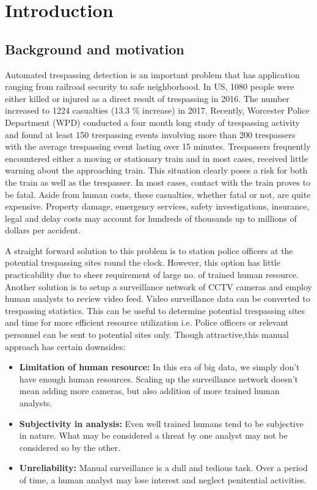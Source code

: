 \section{Introduction}

\subsection{Background and motivation}
Automated trespassing detection is an important problem that has application ranging from railroad security to safe neighborhood. In US, 1080 people were either killed or injured as a direct result of trespassing in 2016\cite{2017trespass}. The number increased to 1224 casualties (13.3 \% increase) in 2017\cite{2018trespass}. Recently, Worcester Police Department (WPD) conducted a four month long study of trespassing activity and found at least 150 trespassing events involving more than 200 trespassers  with the average trespassing event lasting over 15 minutes. Trespassers frequently encountered either a moving or stationary train and in most cases, received little warning about the approaching train. This situation clearly poses a risk for both the train as well as the trespasser.
In most cases, contact with the train proves to
be fatal. Aside from human costs, these casualties, whether fatal or not, are quite expensive. Property damage, emergency services, safety investigations, insurance, legal and delay costs may account for hundreds of thousands up to millions of dollars per accident.

A straight forward solution to this problem is to station police officers at the potential trespassing sites round the clock. However, this option has little practicability due to sheer requirement of large no. of trained human resource. Another solution is to setup a surveillance network of CCTV cameras and employ human analysts to review video feed. Video surveillance data can be converted to trespassing statistics. This can be useful to determine potential trespassing sites and time for more efficient resource utilization i.e. Police officers or relevant personnel can be sent to potential sites only. Though attractive,this manual approach has certain downsides:

\begin{itemize}
\item \textbf{Limitation of human resource:} 
In this era of big data, we simply don't have enough human resources. Scaling up the surveillance network doesn't mean adding more cameras, but also addition of more trained human analysts. 

\item \textbf{Subjectivity in analysis:} Even well trained humans tend to be subjective in nature. What may be considered a threat by one analyst may not be considered so by the other. 

\item \textbf{Unreliability:} Manual surveillance is a dull and tedious task. Over a period of time, a human analyst may lose interest and neglect penitential activities.
\end{itemize}


